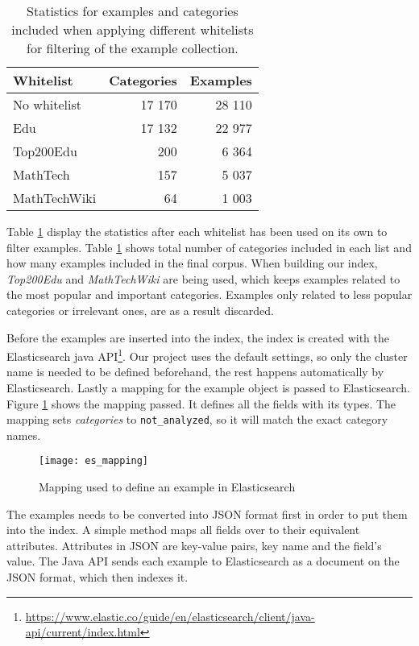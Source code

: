 \begin{table}[h!]
\centering
\begin{tabular} {|| p{10em} | r | r||} 
 \hline
  Whitelist & Categories & Examples \\ [0.5ex] 
 \hline
No whitelist & 17 170 & 28 110 \\
Edu & 17 132 & 22 977 \\
Top200Edu & 200 & 6 364 \\
MathTech & 157 & 5 037 \\
MathTechWiki & 64 & 1 003 \\

 \hline
\end{tabular}
\caption{Statistics for examples and categories included when applying different whitelists for filtering of the example collection.}
\label{table:whitelist_stats}
\end{table}

Table \ref{table:whitelist_stats} display the statistics after each whitelist has been used on its own to filter examples. Table \ref{table:whitelist_stats} shows total number of categories included in each list and how many examples included in the final corpus.
When building our index, \textit{Top200Edu} and \textit{MathTechWiki} are being used, which keeps examples related to the most popular and important categories. Examples only related to less popular categories or irrelevant ones, are as a result discarded.


Before the examples are inserted into the index, the index is created with the Elasticsearch java API\footnote{\url{https://www.elastic.co/guide/en/elasticsearch/client/java-api/current/index.html}}. Our project uses the default settings, so only the cluster name is needed to be defined beforehand, the rest happens automatically by Elasticsearch. Lastly a mapping for the example object is passed to Elasticsearch. Figure \ref{fig:es_mapping} shows the mapping passed. It defines all the fields with its types. The mapping sets \textit{categories} to \texttt{not\_analyzed}, so it will match the exact category names.

\begin{figure}[H] 
\caption{Mapping used to define an example in Elasticsearch}
\centering
\texttt{[image: es\_mapping]}
\label{fig:es_mapping}
\end{figure}

The examples needs to be converted into JSON  format first in order to put them into the index. A simple method maps all fields over to their equivalent attributes. Attributes in JSON are key-value pairs, key name and the field's value. The Java API sends each example to Elasticsearch as a document on the JSON format, which then indexes it.

